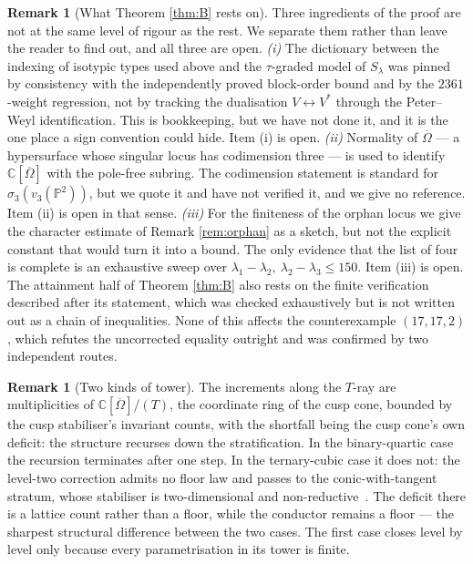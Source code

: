 \documentclass[11pt,reqno]{amsart}
\theoremstyle{plain}
\theoremstyle{definition}
\newtheorem{remark}[theorem]{Remark}
\newcommand{\cO}{\overline{\Omega}}
\newcommand{\bC}{\mathbb{C}}
\begin{document}
\begin{remark}[What Theorem \ref{thm:B} rests on]\label{rem:Bcaveat}
Three ingredients of the proof are not at the same level of rigour as the rest.
We separate them rather than leave the reader to find out, and all three are
open.  \emph{(i)} The
dictionary between the indexing of isotypic types used above and the
$\tau$-graded model of $S_\lambda$ was pinned by consistency with the
independently proved block-order bound and by the $2361$-weight regression, not
by tracking the dualisation $V\leftrightarrow V^{*}$ through the Peter--Weyl
identification.  This is bookkeeping, but we have not done it, and it is the
one place a sign convention could hide.  Item (i) is open.  \emph{(ii)} Normality of
$\cO$ --- a hypersurface whose singular locus has codimension three --- is used
to identify $\bC[\cO]$ with the pole-free subring.  The codimension statement is
standard for $\sigma_3(v_3(\mathbb P^{2}))$, but we quote it and have not
verified it, and we give no reference.  Item (ii) is open in that sense.
\emph{(iii)} For
the finiteness of the orphan locus we give the character estimate of Remark
\ref{rem:orphan} as a sketch, but not the explicit constant that would turn it
into a bound.  The only evidence that the list of four is complete is an
exhaustive sweep over $\lambda_1-\lambda_2,\ \lambda_2-\lambda_3\le150$.  Item
(iii) is open.  The attainment half of Theorem \ref{thm:B} also rests on the
finite verification described after its statement, which was checked
exhaustively but is not written out as a chain of inequalities.  None
of this affects the counterexample $(17,17,2)$, which refutes the
uncorrected equality outright and was confirmed by two independent routes.
\end{remark}

\begin{remark}[Two kinds of tower]\label{rem:towers}
The increments along the $T$-ray are multiplicities of $\bC[\cO]/(T)$, the
coordinate ring of the cusp cone, bounded by the cusp stabiliser's invariant
counts, with the shortfall being the cusp cone's own deficit: the structure
recurses down the stratification.  In the binary-quartic case the recursion
terminates after one step.  In the ternary-cubic case it does not: the level-two
correction admits no floor law and passes to the conic-with-tangent stratum,
whose stabiliser is two-dimensional and non-reductive~\cite{Kraft}.  The
deficit there is a lattice count rather than a floor, while the conductor
remains a floor --- the sharpest structural difference between the two cases.
The first case closes level by level only because every parametrisation in its
tower is finite.
\end{remark}
\end{document}
